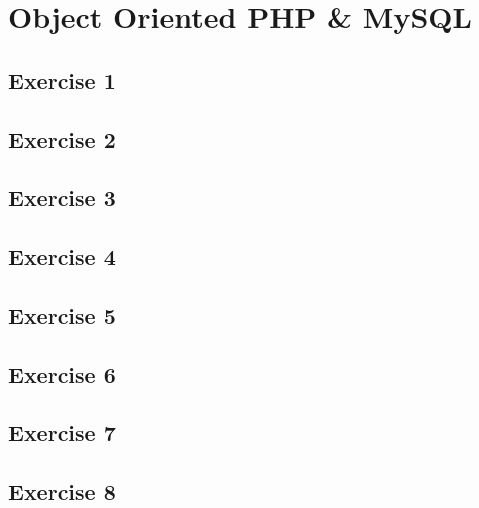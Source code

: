 \chapter{Object Oriented PHP \& MySQL}
\graphicspath{{5-oophp-mysql/images/}}

\section{Exercise 1}
\section{Exercise 2}
\section{Exercise 3}
\section{Exercise 4}
\section{Exercise 5}
\section{Exercise 6}
\section{Exercise 7}
\section{Exercise 8}
